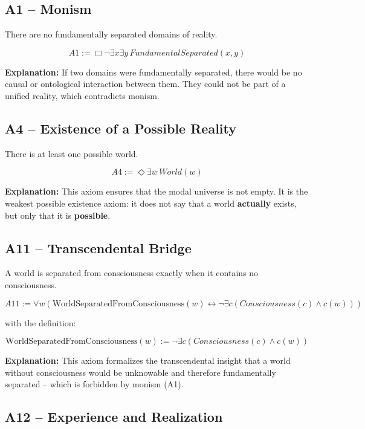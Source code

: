 \documentclass[
]{article}
\begin{document}
\subsection{A1 – Monism}

There are no fundamentally separated domains of reality.

\[
\boxed{A1 := \Box\neg\exists x\exists y\, FundamentalSeparated(x,y)}
\]

\textbf{Explanation:} If two domains were fundamentally separated, there would be no causal or ontological interaction between them. They could not be part of a unified reality, which contradicts monism.

\subsection{A4 – Existence of a Possible Reality}

There is at least one possible world.

\[
\boxed{A4 := \Diamond\exists w\, World(w)}
\]

\textbf{Explanation:} This axiom ensures that the modal universe is not empty. It is the weakest possible existence axiom: it does not say that a world \textbf{actually} exists, but only that it is \textbf{possible}.

\subsection{A11 – Transcendental Bridge}

A world is separated from consciousness exactly when it contains no consciousness.

\[
\boxed{A11 := \forall w \left( \text{WorldSeparatedFromConsciousness}(w) \leftrightarrow \neg \exists c (Consciousness(c) \land c(w)) \right)}
\]

with the definition:

\[
\boxed{\text{WorldSeparatedFromConsciousness}(w) := \neg \exists c (Consciousness(c) \land c(w))}
\]

\textbf{Explanation:} This axiom formalizes the transcendental insight that a world without consciousness would be unknowable and therefore fundamentally separated – which is forbidden by monism (A1).

\subsection{A12 – Experience and Realization}
\end{document}
